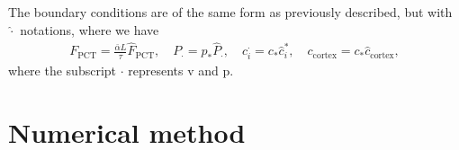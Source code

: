 \documentclass{article}
\begin{document}
The boundary conditions are of the same form as previously described, but with $\hat{\cdot}$ notations, where we have
\begin{gather}
    F_\mathrm{PCT} = \frac{\bar{\alpha}L}{\tau}\hat{F}_\mathrm{PCT},\quad
    P_\cdot = p_*\hat{P}_\cdot,\quad
    c_i^\cdot = c_*\hat{c}_i^*,\quad c_\mathrm{cortex} = c_*\hat{c}_\mathrm{cortex},
\end{gather}
    where the subscript $\cdot$ represents $\mathrm{v}$ and $\mathrm{p}$.

\section{Numerical method}

\end{document}
